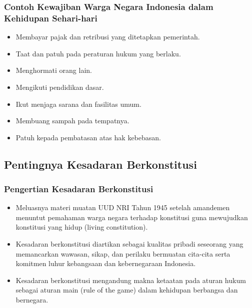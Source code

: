 \subsubsection{Contoh Kewajiban Warga Negara Indonesia dalam Kehidupan Sehari-hari}
\begin{itemize}
\item Membayar pajak dan retribusi yang ditetapkan pemerintah.
\item Taat dan patuh pada peraturan hukum yang berlaku.
\item Menghormati orang lain.
\item Mengikuti pendidikan dasar.
\item Ikut menjaga sarana dan fasilitas umum.
\item Membuang sampah pada tempatnya.
\item Patuh kepada pembatasan atas hak kebebasan.
\end{itemize}

\subsection{Pentingnya Kesadaran Berkonstitusi}

\subsubsection{Pengertian Kesadaran Berkonstitusi}
\begin{itemize}
\item Meluasnya materi muatan UUD NRI Tahun 1945 setelah amandemen menuntut pemahaman warga negara terhadap konstitusi guna mewujudkan konstitusi yang hidup (living constitution).
\item Kesadaran berkonstitusi diartikan sebagai kualitas pribadi seseorang yang memancarkan wawasan, sikap, dan perilaku bermuatan cita-cita serta komitmen luhur kebangsaan dan kebernegaraan Indonesia.
\item Kesadaran berkonstitusi mengandung makna ketaatan pada aturan hukum sebagai aturan main (rule of the game) dalam kehidupan berbangsa dan bernegara.
\end{itemize}

